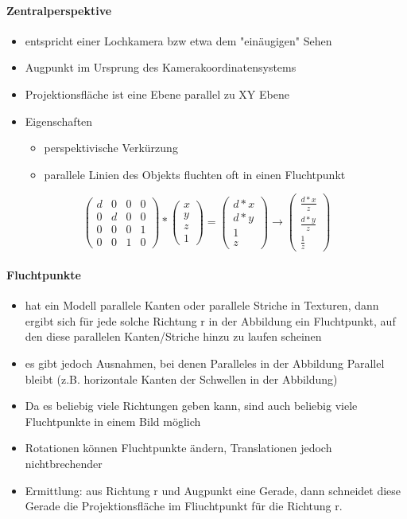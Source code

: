 \documentclass[10pt,landscape]{article}
\begin{document}
\begin{multicols}{3}
\paragraph{Zentralperspektive}
\begin{itemize}
  \item entspricht einer Lochkamera bzw etwa dem "einäugigen" Sehen
  \item Augpunkt im Ursprung des Kamerakoordinatensystems
  \item Projektionsfläche ist eine Ebene parallel zu XY Ebene
  \item Eigenschaften
  \begin{itemize}
    \item perspektivische Verkürzung
    \item parallele Linien des Objekts fluchten oft in einen Fluchtpunkt
  \end{itemize}
\end{itemize}
$$\begin{pmatrix} d&0&0&0\\ 0&d&0&0 \\ 0&0&0&1 \\ 0&0&1&0 \end{pmatrix} * \begin{pmatrix}x\\y\\z\\1\end{pmatrix} = \begin{pmatrix} d*x\\ d*y\\ 1 \\ z \end{pmatrix} \rightarrow \begin{pmatrix} \frac{d*x}{z} \\ \frac{d*y}{z} \\ \frac{1}{z} \end{pmatrix}$$

\paragraph{Fluchtpunkte}
\begin{itemize}
    \item hat ein Modell parallele Kanten oder parallele Striche in Texturen, dann ergibt sich für jede solche Richtung r in der Abbildung ein Fluchtpunkt, auf den diese parallelen Kanten/Striche hinzu zu laufen scheinen
    \item es gibt jedoch Ausnahmen, bei denen Paralleles in der Abbildung Parallel bleibt (z.B. horizontale Kanten der Schwellen in der Abbildung)
    \item Da es beliebig viele Richtungen geben kann, sind auch beliebig viele Fluchtpunkte in einem Bild möglich
    \item Rotationen können Fluchtpunkte ändern, Translationen jedoch nichtbrechender
    \item Ermittlung: aus Richtung r und Augpunkt eine Gerade, dann schneidet diese Gerade die Projektionsfläche im Fliuchtpunkt für die Richtung r.
  \end{itemize}


\end{multicols}
\end{document}
